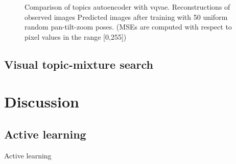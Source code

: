 \begin{figure}
    \begin{center}
    \end{center}
    \caption{ Comparison of topics autoencoder with vqvae.
    \protect{} Reconstructions of observed images
    \protect{} Predicted images after training with 50 uniform random pan-tilt-zoom poses.
    (MSEs are computed with respect to pixel values in the range [0,255])
    }
    \label{fig:vs_vqvae}
\end{figure}

\subsection{Visual topic-mixture search}

\section{Discussion}
\subsection{Active learning}\label{sec:active-learning}
Active learning \citep{Jayaraman2017}


